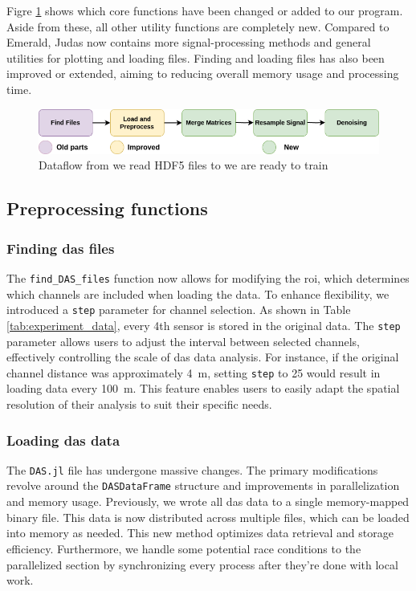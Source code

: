 Figre \ref{fig:apiflow} shows which core functions have been changed or added to our program. Aside from these, all other utility functions are completely new. Compared to Emerald, Judas now contains more signal-processing methods and general utilities for plotting and loading files. Finding and loading files has also been improved or extended, aiming to reducing overall memory usage and processing time.
\\

\begin{figure}[!h]
    \centering
    \includegraphics[scale=0.5]{figures/dataflow.png}
    \caption{Dataflow from we read HDF5 files to we are ready to train}
    \label{fig:apiflow}
\end{figure}


\subsection{Preprocessing functions}

\subsubsection{Finding \acrshort{das} files}

The \texttt{find\_DAS\_files} function now allows for modifying the \acrfull{roi}, which determines which channels are included when loading the data. To enhance flexibility, we introduced a \texttt{step} parameter for channel selection. As shown in Table \ref{tab:experiment_data}, every 4th sensor is stored in the original data. The \texttt{step} parameter allows users to adjust the interval between selected channels, effectively controlling the scale of \acrshort{das} data analysis. For instance, if the original channel distance was approximately \qty{4}{\meter}, setting \texttt{step} to 25 would result in loading data every \qty{100}{\meter}. This feature enables users to easily adapt the spatial resolution of their analysis to suit their specific needs.

\subsubsection{Loading \acrshort{das} data}

The \texttt{DAS.jl} file has undergone massive changes. The primary modifications revolve around the \texttt{DASDataFrame} structure and improvements in parallelization and memory usage. Previously, we wrote all \acrshort{das} data to a single memory-mapped binary file. This data is now distributed across multiple files, which can be loaded into memory as needed. This new method optimizes data retrieval and storage efficiency. Furthermore, we handle some potential race conditions to the parallelized section by synchronizing every process after they're done with local work. 

